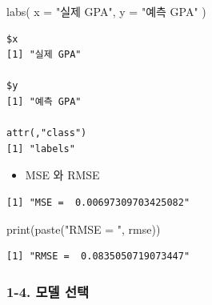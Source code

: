 \documentclass[
  letterpaper,
  DIV=11,
  numbers=noendperiod]{scrartcl}
\newenvironment{Shaded}{\begin{snugshade}}{\end{snugshade}}
\newcommand{\AttributeTok}[1]{\textcolor[rgb]{0.40,0.45,0.13}{#1}}
\newcommand{\CommentTok}[1]{\textcolor[rgb]{0.37,0.37,0.37}{#1}}
\newcommand{\DecValTok}[1]{\textcolor[rgb]{0.68,0.00,0.00}{#1}}
\newcommand{\FunctionTok}[1]{\textcolor[rgb]{0.28,0.35,0.67}{#1}}
\newcommand{\NormalTok}[1]{\textcolor[rgb]{0.00,0.23,0.31}{#1}}
\newcommand{\OtherTok}[1]{\textcolor[rgb]{0.00,0.23,0.31}{#1}}
\newcommand{\SpecialCharTok}[1]{\textcolor[rgb]{0.37,0.37,0.37}{#1}}
\newcommand{\StringTok}[1]{\textcolor[rgb]{0.13,0.47,0.30}{#1}}
\providecommand{\tightlist}{%
  \setlength{\itemsep}{0pt}\setlength{\parskip}{0pt}}\usepackage{longtable,booktabs,array}
\begin{document}
\begin{Shaded}
\begin{Highlighting}[]
  \FunctionTok{labs}\NormalTok{( }
    \AttributeTok{x =} \StringTok{"실제 GPA"}\NormalTok{, }\AttributeTok{y =} \StringTok{"예측 GPA"}
\NormalTok{    )}
\end{Highlighting}
\end{Shaded}

\begin{verbatim}
$x
[1] "실제 GPA"

$y
[1] "예측 GPA"

attr(,"class")
[1] "labels"
\end{verbatim}

\begin{itemize}
\tightlist
\item
  MSE 와 RMSE
\end{itemize}

\begin{Shaded}
\end{Shaded}

\begin{verbatim}
[1] "MSE =  0.00697309703425082"
\end{verbatim}

\begin{Shaded}
\begin{Highlighting}[]
\FunctionTok{print}\NormalTok{(}\FunctionTok{paste}\NormalTok{(}\StringTok{"RMSE = "}\NormalTok{, rmse))}
\end{Highlighting}
\end{Shaded}

\begin{verbatim}
[1] "RMSE =  0.0835050719073447"
\end{verbatim}

\subsubsection{1-4. 모델 선택}\label{uxbaa8uxb378-uxc120uxd0dd}
\end{document}
